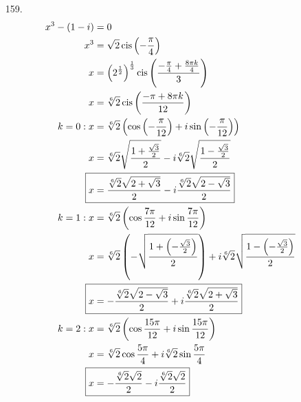 \documentclass{article}
\DeclareMathOperator{\cis}{cis}
\begin{document}
\begin{itemize}
\item[159.]  
	\begin{align*}
		x^3-(1-i)&=0 \\
		x^3&=\sqrt{2}\cis\left(-\frac{\pi}{4}\right) \\
		x&=\left(2^{\frac{1}{2}}\right)^{\frac{1}{3}}\cis\left(\frac{-\frac{\pi}{4}+\frac{8\pi k}{4}}{3}\right) \\
		x&=\sqrt[6]{2}\cis\left(\frac{-\pi+8\pi k}{12}\right) \\
		k=0:x&=\sqrt[6]{2}\left(\cos\left(-\frac{\pi}{12}\right)+i\sin\left(-\frac{\pi}{12}\right)\right) \\
		x&=\sqrt[6]{2}\sqrt{\frac{1+\frac{\sqrt{3}}{2}}{2}}-i\sqrt[6]{2}\sqrt{\frac{1-\frac{\sqrt{3}}{2}}{2}} \\
		\Aboxed{x&=\frac{\sqrt[6]{2}\sqrt{2+\sqrt{3}}}{2}-i\frac{\sqrt[6]{2}\sqrt{2-\sqrt{3}}}{2}} \\
		k=1:x&=\sqrt[6]{2}\left(\cos\frac{7\pi}{12}+i\sin\frac{7\pi}{12}\right) \\
		x&=\sqrt[6]{2}\left(-\sqrt{\frac{1+\left(-\frac{\sqrt{3}}{2}\right)}{2}}\right)+i\sqrt[6]{2}\sqrt{\frac{1-\left(-\frac{\sqrt{3}}{2}\right)}{2}} \\
		\Aboxed{x&=-\frac{\sqrt[6]{2}\sqrt{2-\sqrt{3}}}{2}+i\frac{\sqrt[6]{2}\sqrt{2+\sqrt{3}}}{2}} \\
		k=2:x&=\sqrt[6]{2}\left(\cos\frac{15\pi}{12}+i\sin\frac{15\pi}{12}\right) \\
		x&=\sqrt[6]{2}\cos\frac{5\pi}{4}+i\sqrt[6]{2}\sin\frac{5\pi}{4} \\
		\Aboxed{x&=-\frac{\sqrt[6]{2}\sqrt{2}}{2}-i\frac{\sqrt[6]{2}\sqrt{2}}{2}} \\
	\end{align*}
\end{itemize}
\end{document}
